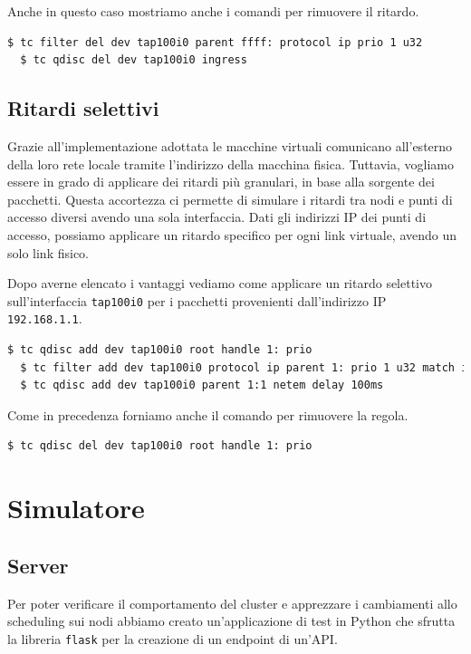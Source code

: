 \documentclass[12pt, hidelinks]{report}
\begin{document}
Anche in questo caso mostriamo anche i comandi per rimuovere il ritardo.

\begin{lstlisting}[language=bash]
  $ tc filter del dev tap100i0 parent ffff: protocol ip prio 1 u32
  $ tc qdisc del dev tap100i0 ingress
\end{lstlisting}

\subsection{Ritardi selettivi}
Grazie all'implementazione adottata le macchine virtuali comunicano all'esterno della loro rete locale tramite l'indirizzo della macchina fisica. Tuttavia, vogliamo essere in grado di applicare dei ritardi più granulari, in base alla sorgente dei pacchetti. Questa accortezza ci permette di simulare i ritardi tra nodi e punti di accesso diversi avendo una sola interfaccia. Dati gli indirizzi IP dei punti di accesso, possiamo applicare un ritardo specifico per ogni link virtuale, avendo un solo link fisico. 

Dopo averne elencato i vantaggi vediamo come applicare un ritardo selettivo sull'interfaccia \texttt{tap100i0} per i pacchetti provenienti dall'indirizzo IP \texttt{192.168.1.1}.

\begin{lstlisting}[language=bash]
  $ tc qdisc add dev tap100i0 root handle 1: prio
  $ tc filter add dev tap100i0 protocol ip parent 1: prio 1 u32 match ip src 192.168.1.1 flowid 1:1
  $ tc qdisc add dev tap100i0 parent 1:1 netem delay 100ms
\end{lstlisting}

Come in precedenza forniamo anche il comando per rimuovere la regola.

\begin{lstlisting}[language=bash]
  $ tc qdisc del dev tap100i0 root handle 1: prio
\end{lstlisting}

\section{Simulatore}
\subsection{Server}
Per poter verificare il comportamento del cluster e apprezzare i cambiamenti allo scheduling sui nodi abbiamo creato un'applicazione di test in Python che sfrutta la libreria \texttt{flask} per la creazione di un endpoint di un'API. 
\end{document}
